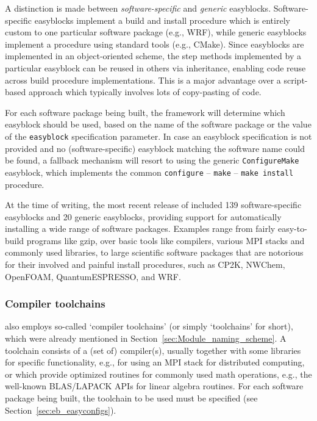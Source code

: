 A distinction is made between \emph{software-specific} and \emph{generic} easyblocks.
Software-specific easyblocks implement a build and install procedure which is
entirely custom to one particular software package (e.g., WRF), while
generic easyblocks implement a procedure using standard tools (e.g., CMake).
Since easyblocks are implemented in an object-oriented scheme,
the step methods implemented by a particular easyblock can be reused in others via
inheritance, enabling code reuse across build procedure implementations.
This is a major advantage over a script-based approach which typically involves
lots of copy-pasting of code.

For each software package being built, the \easybuild{} framework will determine
which easyblock should be used, based on the name of the software package or the
value of the \texttt{\small easyblock} specification parameter. In case an easyblock
specification is not provided and no (software-specific) easyblock matching the
software name could be found, a fallback mechanism will resort to using the generic
\texttt{\small ConfigureMake} easyblock, which implements the common
\texttt{\small configure} -- \texttt{\small make} -- \texttt{\small make install}
procedure.

At the time of writing, the most recent release of \easybuild{} included 139
software-specific easyblocks and 20 generic easyblocks, providing support for
automatically installing a wide range of software packages. Examples range
from fairly easy-to-build programs like gzip, over basic tools like
compilers, various MPI stacks and commonly used libraries, to large scientific
software packages that are notorious for their involved and painful install
procedures, such as CP2K, NWChem, OpenFOAM, QuantumESPRESSO, and WRF.

\subsubsection{Compiler toolchains}
\label{sec:eb_toolchains}

\easybuild{} also employs so-called `compiler toolchains' (or simply `toolchains'
for short), which were already mentioned in Section~\ref{sec:Module_naming_scheme}.
A toolchain consists of a (set of) compiler(s), usually together with some
libraries for specific functionality, e.g., for using an MPI stack for distributed
computing, or which provide optimized routines for commonly used math operations,
e.g., the well-known BLAS/LAPACK APIs for linear algebra routines. For each software
package being built, the toolchain to be used must be specified
(see Section~\ref{sec:eb_easyconfigs}).

